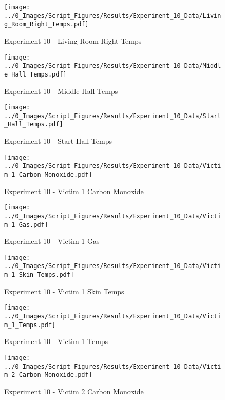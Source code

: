 	\begin{figure}[H]
		\centering
		\texttt{[image: ../0\_Images/Script\_Figures/Results/Experiment\_10\_Data/Living\_Room\_Right\_Temps.pdf]}
		\caption[]{Experiment 10 - Living Room Right Temps}
	\end{figure}
 
	\clearpage

	\begin{figure}[H]
		\centering
		\texttt{[image: ../0\_Images/Script\_Figures/Results/Experiment\_10\_Data/Middle\_Hall\_Temps.pdf]}
		\caption[]{Experiment 10 - Middle Hall Temps}
	\end{figure}
 

	\begin{figure}[H]
		\centering
		\texttt{[image: ../0\_Images/Script\_Figures/Results/Experiment\_10\_Data/Start\_Hall\_Temps.pdf]}
		\caption[]{Experiment 10 - Start Hall Temps}
	\end{figure}
 
	\clearpage

	\begin{figure}[H]
		\centering
		\texttt{[image: ../0\_Images/Script\_Figures/Results/Experiment\_10\_Data/Victim\_1\_Carbon\_Monoxide.pdf]}
		\caption[]{Experiment 10 - Victim 1 Carbon Monoxide}
	\end{figure}
 

	\begin{figure}[H]
		\centering
		\texttt{[image: ../0\_Images/Script\_Figures/Results/Experiment\_10\_Data/Victim\_1\_Gas.pdf]}
		\caption[]{Experiment 10 - Victim 1 Gas}
	\end{figure}
 
	\clearpage

	\begin{figure}[H]
		\centering
		\texttt{[image: ../0\_Images/Script\_Figures/Results/Experiment\_10\_Data/Victim\_1\_Skin\_Temps.pdf]}
		\caption[]{Experiment 10 - Victim 1 Skin Temps}
	\end{figure}
 

	\begin{figure}[H]
		\centering
		\texttt{[image: ../0\_Images/Script\_Figures/Results/Experiment\_10\_Data/Victim\_1\_Temps.pdf]}
		\caption[]{Experiment 10 - Victim 1 Temps}
	\end{figure}
 
	\clearpage

	\begin{figure}[H]
		\centering
		\texttt{[image: ../0\_Images/Script\_Figures/Results/Experiment\_10\_Data/Victim\_2\_Carbon\_Monoxide.pdf]}
		\caption[]{Experiment 10 - Victim 2 Carbon Monoxide}
	\end{figure}
 

